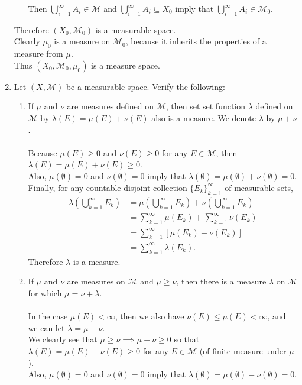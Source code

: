 \begin{enumerate}
\begin{enumerate}[label=(\roman*),align=left]
		Then $\bigcup_{i=1}^\infty A_i\in\mathcal{M}$ and $\bigcup_{i=1}^\infty A_i\subseteq X_0$ imply that $\bigcup_{i=1}^\infty A_i\in\mathcal{M}_0$.
	\end{enumerate}
	Therefore $(X_0,\mathcal{M}_0)$ is a measurable space.\\
	Clearly $\mu_0$ is a measure on $\mathcal{M}_0$, because it inherits the properties of a measure from $\mu$.\\
	Thus $(X_0,\mathcal{M}_0,\mu_0)$ is a measure space.
	\item Let $(X,\mathcal{M})$ be a measurable space. Verify the following:
	\begin{enumerate}[label=(\roman*),align=left]  
		\item If $\mu$ and $\nu$ are measures defined on $\mathcal{M}$, then set set function $\lambda$ defined on $\mathcal{M}$ by $\lambda(E)=\mu(E)+\nu(E)$ also is a measure. We denote $\lambda$ by $\mu+\nu$.\\
		\\Because $\mu(E)\ge 0$ and $\nu(E)\ge 0$ for any $E\in\mathcal{M}$, then $\lambda(E)=\mu(E)+\nu(E)\ge 0$.
		\\Also, $\mu(\emptyset)= 0$ and $\nu(\emptyset)= 0$ imply that $\lambda(\emptyset)=\mu(\emptyset)+\nu(\emptyset)= 0$.
		\\Finally, for any countable disjoint collection $\{E_k\}_{k=1}^\infty$ of measurable sets,
		\begin{align*}
			\lambda\left(\bigcup_{k=1}^\infty E_k\right)&=\mu\left(\bigcup_{k=1}^\infty E_k\right)+\nu\left(\bigcup_{k=1}^\infty E_k\right)\\
			&=\sum_{k=1}^\infty\mu(E_k)+\sum_{k=1}^\infty\nu(E_k)\\
			&=\sum_{k=1}^\infty[\mu(E_k)+\nu(E_k)]\\
			&=\sum_{k=1}^\infty\lambda(E_k).
		\end{align*}
		Therefore $\lambda$ is a measure.
		\item If $\mu$ and $\nu$ are measures on $\mathcal{M}$ and $\mu\ge\nu$, then there is a measure $\lambda$ on $\mathcal{M}$ for which $\mu=\nu+\lambda$.\\
		\\In the case $\mu(E)<\infty$, then we also have $\nu(E)\le\mu(E)<\infty$, and we can let $\lambda = \mu-\nu$.
		\\We clearly see that $\mu\ge\nu\implies\mu-\nu\ge0$ so that $\lambda(E)=\mu(E)-\nu(E)\ge 0$ for any $E\in\mathcal{M}$ (of finite measure under $\mu$).
		\\Also, $\mu(\emptyset)= 0$ and $\nu(\emptyset)= 0$ imply that $\lambda(\emptyset)=\mu(\emptyset)-\nu(\emptyset)= 0$.

\end{enumerate}
\end{enumerate}

